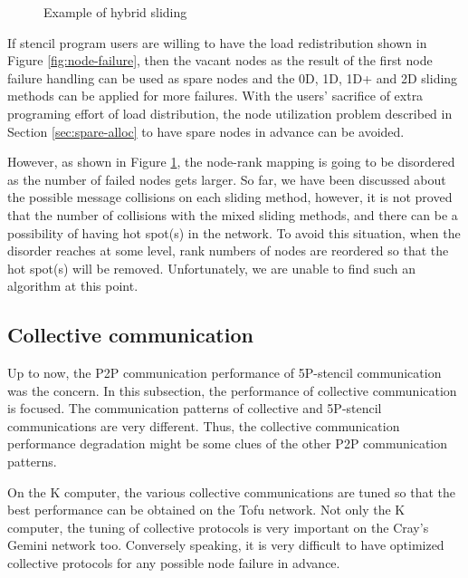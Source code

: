 \documentclass[10pt,conference,a4paper,fleqn]{IEEEtran}
\begin{document}
\begin{figure}[ht]
\begin{center}
  \caption{Example of hybrid sliding} 
  \label{fig:hybrid-sliding}
\end{center}
\end{figure}

If stencil program users are willing to have the load redistribution
shown in Figure \ref{fig:node-failure}, then the vacant nodes as the
result of the first node failure handling can be used as spare nodes
and the 0D, 1D, 1D+ and 2D sliding methods can be applied for more
failures. With the users' sacrifice of extra programing effort of load 
distribution, the node utilization problem described in Section
\ref{sec:spare-alloc} to have spare nodes in advance can be avoided. 

However, as shown in Figure \ref{fig:hybrid-sliding}, the node-rank
mapping is going to be disordered as the number of failed nodes gets
larger. So far, we have been discussed about the possible message
collisions on each sliding method, however, it is not proved that the
number of collisions with the mixed sliding methods, and there can be a
possibility of having hot spot(s) in the network. To avoid this
situation, when the disorder reaches at some level, rank numbers of
nodes are reordered so that the hot spot(s) will be
removed. Unfortunately, we are unable to find such an algorithm at
this point. 

\subsection{Collective communication}

Up to now, the P2P communication performance of 5P-stencil
communication was the concern. In this subsection, the performance of
collective communication is focused. The communication patterns of
collective and 5P-stencil communications are very different. Thus, the
collective communication performance degradation might be some clues of
the other P2P communication patterns.

On the K computer, the various collective communications are tuned so
that the best performance can be obtained on the Tofu network. Not
only the K computer, the tuning of collective protocols is very
important on the Cray's Gemini network
too\cite{Pena:2013:ATM:2488551.2488564}. Conversely speaking, it 
is very difficult to have optimized collective protocols for any
possible node failure in advance.
\end{document}
